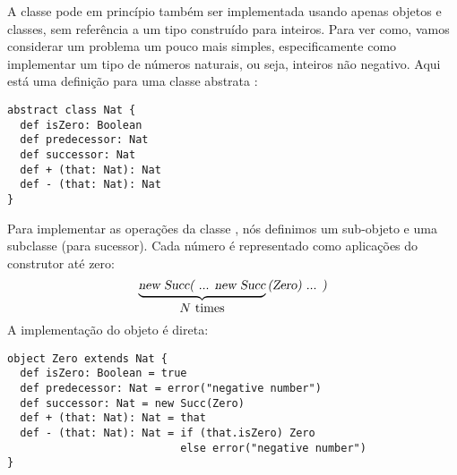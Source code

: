 A classe  pode em princ\'{i}pio tamb\'{e}m ser implementada usando
apenas objetos e classes, sem refer\^{e}ncia a um tipo constru\'{i}do para 
inteiros. Para ver como, vamos considerar um problema um pouco mais 
simples, especificamente como implementar um tipo  de 
n\'{u}meros naturais, ou seja, inteiros n\~{a}o negativo. Aqui est\'{a} uma defini\c{c}\~{a}o 
para uma classe abstrata :
\begin{lstlisting}
abstract class Nat {
  def isZero: Boolean
  def predecessor: Nat
  def successor: Nat
  def + (that: Nat): Nat
  def - (that: Nat): Nat
}
\end{lstlisting}

Para implementar as opera\c{c}\~{o}es da classe , n\'{o}s definimos um
sub-objeto  e uma subclasse  (para sucessor). Cada 
n\'{u}mero  \'{e} representado como  aplica\c{c}\~{o}es do construtor 
at\'{e} zero: 
 \[
 \underbrace{\mbox{\sl new Succ( ... new Succ}}_{\mbox{$N$ times}}\mbox{\sl (Zero) ... )}
 \]
A implementa\c{c}\~{a}o do objeto  \'{e} direta:
\begin{lstlisting}
object Zero extends Nat {
  def isZero: Boolean = true
  def predecessor: Nat = error("negative number")
  def successor: Nat = new Succ(Zero)
  def + (that: Nat): Nat = that
  def - (that: Nat): Nat = if (that.isZero) Zero
                           else error("negative number")
}
\end{lstlisting}



